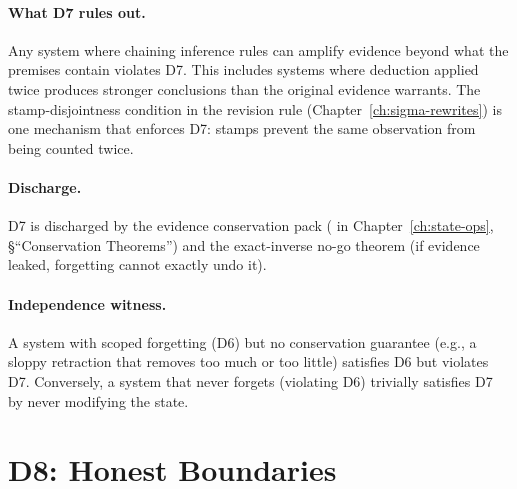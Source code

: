 \documentclass[11pt,openany]{report}
\begin{document}
\paragraph{What D7 rules out.}
Any system where chaining inference rules can amplify evidence beyond
what the premises contain violates D7.  This includes systems where
deduction applied twice produces stronger conclusions than the
original evidence warrants.  The stamp-disjointness condition in the
revision rule (Chapter~\ref{ch:sigma-rewrites}) is one mechanism that
enforces D7: stamps prevent the same observation from being counted
twice.

\paragraph{Discharge.}
D7 is discharged by the evidence conservation pack
( in
Chapter~\ref{ch:state-ops}, \S``Conservation Theorems'') and the
exact-inverse no-go theorem (if evidence leaked, forgetting cannot
exactly undo it).

\paragraph{Independence witness.}
A system with scoped forgetting (D6) but no conservation guarantee
(e.g., a sloppy retraction that removes too much or too little)
satisfies D6 but violates D7.  Conversely, a system that never forgets
(violating D6) trivially satisfies D7 by never modifying the state.



\section{D8: Honest Boundaries}
\label{sec:d8}
\end{document}
